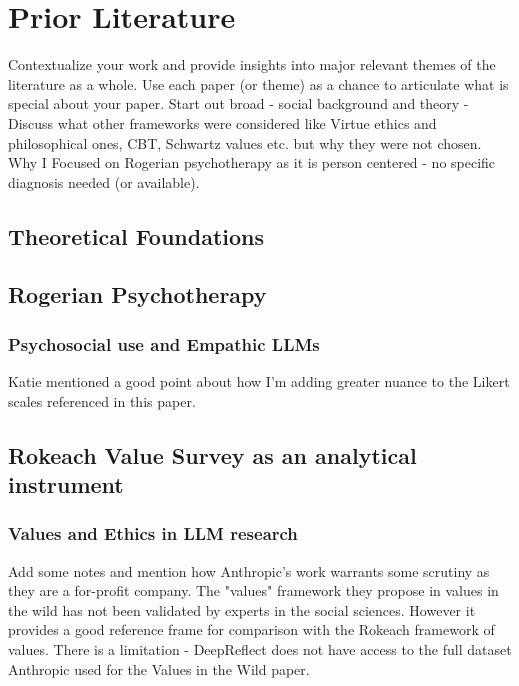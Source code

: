 \section{Prior Literature}\label{sec:Litreview}

\textcolor{black!40}{Contextualize your work and provide insights into major relevant themes of the literature as a whole. Use each paper (or theme) as a chance to articulate what is special about your paper. Start out broad - social background and theory - Discuss what other frameworks were considered like Virtue ethics and philosophical ones, CBT, Schwartz values etc. but why they were not chosen. Why I Focused on Rogerian psychotherapy as it is person centered - no specific diagnosis needed (or available).}


\subsection{Theoretical Foundations}

\subsection{Rogerian Psychotherapy}
\textcolor{black!30}{\lipsum[8-9]}
\subsubsection{Psychosocial use and Empathic LLMs}
\textcolor{black!30}{\lipsum[14-16]}
\textcolor{black!30}{Katie mentioned a good point about how I'm adding greater nuance to the Likert scales referenced in this paper.}

\subsection{Rokeach Value Survey as an analytical instrument}
\textcolor{black!30}{\lipsum[6-7]}
\subsubsection{Values and Ethics in LLM research}
\textcolor{black!30}{\lipsum[7-8]}
\textcolor{black!30}{Add some notes and mention how Anthropic's work warrants some scrutiny as they are a for-profit company. The "values" framework they propose in values in the wild has not been validated by experts in the social sciences. However it provides a good reference frame for comparison with the Rokeach framework of values. There is a limitation - DeepReflect does not have access to the full dataset Anthropic used for the Values in the Wild paper.}

